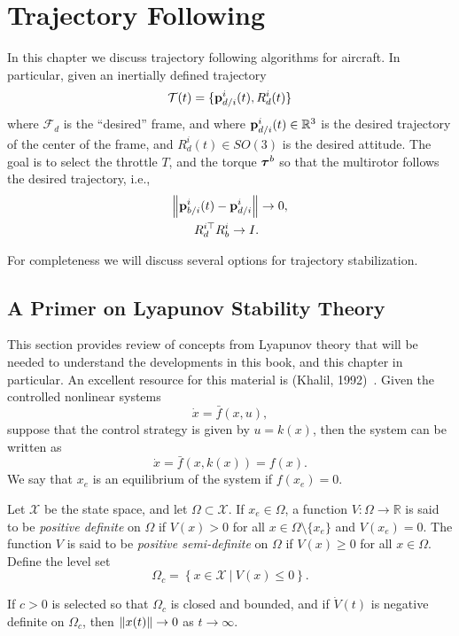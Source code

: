 \chapter{Trajectory Following}
\label{chap:trajectory_following}

In this chapter we discuss trajectory following algorithms for aircraft.  In particular, given an inertially defined trajectory 
\[
\mathbf{\mathcal{T}}(t) = \{\mathbf{p}_{d/i}^i(t), R_d^i(t)\}
\]
where $\mathcal{F}_d$ is the ``desired'' frame, and where $\mathbf{p}_{d/i}^i(t)\in\mathbb{R}^3$ is the desired trajectory of the center of the frame, and $R_d^i(t)\in SO(3)$ is the desired attitude.  The goal is to select the throttle $T$, and the torque $\boldsymbol{\tau}^b$ so that the multirotor follows the desired trajectory, i.e., 
\begin{align*}
\left\|\mathbf{p}_{b/i}^i(t) - \mathbf{p}_{d/i}^i\right\| &\to 0, \\
R_d^{i\top} R_b^i \to I.
\end{align*}

For completeness we will discuss several options for trajectory stabilization.  


\section{A Primer on Lyapunov Stability Theory}

This section provides review of concepts from Lyapunov theory that will be needed to understand the developments in this book, and this chapter in particular.  An excellent resource for this material is (Khalil, 1992)~\cite{Khalil92}.  Given the controlled nonlinear systems 
\[
\dot{x}=\bar{f}(x,u),
\]
suppose that the control strategy is given by $u=k(x)$, then the system can be written as
\[
\dot{x} = \bar{f}(x,k(x)) = f(x).
\]
We say that $x_e$ is an equilibrium of the system if $f(x_e)=0$.

Let $\mathcal{X}$ be the state space, and let $\Omega\subset\mathcal{X}$.  If $x_e\in\Omega$, a function $V:\Omega\to\mathbb{R}$ is said to be {\em positive definite} on $\Omega$ if $V(x)>0$ for all $x\in\Omega\setminus\{x_e\}$ and $V(x_e)=0$.  The function $V$ is said to be {\em positive semi-definite} on $\Omega$ if $V(x)\geq 0$ for all $x\in\Omega$.  Define the level set
\[
\Omega_c = \left\{ x\in\mathcal{X} ~|~ V(x) \leq 0 \right\}.
\]

\begin{theorem} \label{thm:lyapunov_theorem}
If $c>0$ is selected so that $\Omega_c$ is closed and bounded, and if $\dot{V}(t)$ is negative definite on $\Omega_c$, then $\left\|x(t)\right\|\to 0$ as $t\to\infty$.
\end{theorem}

